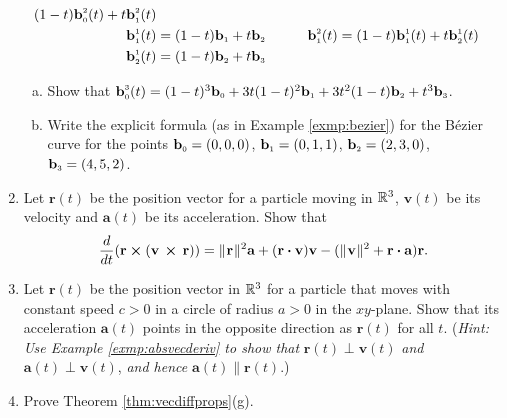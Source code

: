 \begin{enumerate}[\bfseries 1.]
\begin{alignat*}{3}
    ( 1 - t )\textbf{b}_{\scriptscriptstyle 0}^{\scriptscriptstyle 2}(t) + t \textbf{b}_{\scriptscriptstyle 1}^{\scriptscriptstyle 2}(t)\\
   \textbf{b}_{\scriptscriptstyle 1}^{\scriptscriptstyle 1}(t) &= ( 1 - t )\textbf{b}_{\scriptscriptstyle 1} + t \textbf{b}_{\scriptscriptstyle 2} \qquad
    & \textbf{b}_{\scriptscriptstyle 1}^{\scriptscriptstyle 2}(t) &=
    ( 1 - t )\textbf{b}_{\scriptscriptstyle 1}^{\scriptscriptstyle 1}(t) + t \textbf{b}_{\scriptscriptstyle 2}^{\scriptscriptstyle 1}(t)\\
   \textbf{b}_{\scriptscriptstyle 2}^{\scriptscriptstyle 1}(t) &= ( 1 - t )\textbf{b}_{\scriptscriptstyle 2} + t \textbf{b}_{\scriptscriptstyle 3}
  \end{alignat*}
  \begin{enumerate}[(a)]
   \item Show that $\textbf{b}_{\scriptscriptstyle 0}^{\scriptscriptstyle 3}(t) = (1 - t)^3 \textbf{b}_{\scriptscriptstyle 0} +
    3t(1 - t)^2 \textbf{b}_{\scriptscriptstyle 1} + 3t^2 (1 - t) \textbf{b}_{\scriptscriptstyle 2} + t^3 \textbf{b}_{\scriptscriptstyle 3}$.
   \item Write the explicit formula (as in Example \ref{exmp:bezier}) for the B\'{e}zier curve for the points
   $\textbf{b}_{\scriptscriptstyle 0} = (0,0,0)$, $\textbf{b}_{\scriptscriptstyle 1} = (0,1,1)$, $\textbf{b}_{\scriptscriptstyle 2} = (2,3,0)$,
   $\textbf{b}_{\scriptscriptstyle 3} = (4,5,2)$.
  \end{enumerate}
\item 
Let $\textbf{r}(t)$ be the position vector for a particle moving in $\mathbb{R}^{3}$,
$\textbf{v}(t)$ be its velocity 
and $\textbf{a}(t)$ be its acceleration.
Show that
  \begin{displaymath}
   \dfrac{d}{dt} ( \textbf{r} \bm{\times} ( \textbf{v}\, \bm{\times} \,\textbf{r} ) ) =
    \lVert\mspace{1mu}\textbf{r}\mspace{1mu}\rVert^2 \textbf{a} + (\textbf{r} \bm{\cdot} \textbf{v}) \textbf{v} -
    (\lVert\mspace{1mu}\textbf{v}\mspace{1mu}\rVert^2 + \textbf{r} \bm{\cdot} \textbf{a})\textbf{r}.
  \end{displaymath} 
\item 
Let $\textbf{r}(t)$ be the position vector in $\mathbb{R}^{3}$ for a particle that moves with constant speed $c > 0$ in a circle of radius $a > 0$ in the $xy$-plane. 
Show that its acceleration $\textbf{a}(t)$ points in the opposite direction as
  $\textbf{r}(t)$ for all $t$. (\emph{Hint: Use Example \ref{exmp:absvecderiv} to show that} $\textbf{r}(t)
  \perp \textbf{v}(t)$ \emph{and} $\textbf{a}(t) \perp \textbf{v}(t)$, \emph{and hence} $\textbf{a}(t) \parallel
  \textbf{r}(t)$.)
 \item Prove Theorem \ref{thm:vecdiffprops}(g).
\end{enumerate}
\newpage
